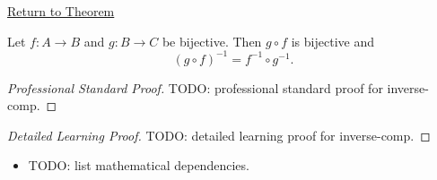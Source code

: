 \newpage
{}
\label{prf:inverse-comp}

\begin{remark*}[Return]
\hyperref[thm:inverse-comp]{Return to Theorem}
\end{remark*}

\begin{theorem*}
Let $f : A \to B$ and $g : B \to C$ be bijective. Then $g \circ f$ is
bijective and
\[
(g \circ f)^{-1} = f^{-1} \circ g^{-1}.
\]
\end{theorem*}

\begin{proof}[Professional Standard Proof]
\LRAProofBodyStart
TODO: professional standard proof for inverse-comp.
\end{proof}

\begin{proof}[Detailed Learning Proof]
\LRAProofBodyStart
TODO: detailed learning proof for inverse-comp.
\end{proof}

\begin{remark*}
\end{remark*}

\begin{dependencies}
\begin{itemize}
  \item TODO: list mathematical dependencies.
\end{itemize}
\end{dependencies}

\clearpage
